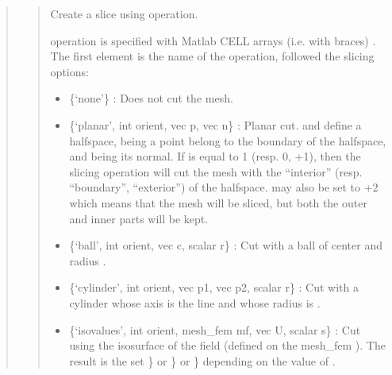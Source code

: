 \documentclass[a4paper,11pt,english]{sphinxmanual}
\begin{document}
\sphinxAtStartPar
{}
\begin{quote}

\sphinxAtStartPar
{}
\begin{quote}

\sphinxAtStartPar
Create a slice using  operation.

\sphinxAtStartPar
{} operation is specified with Matlab CELL arrays (i.e.
with braces) . The first element is the
name of the operation, followed the slicing options:
\begin{itemize}
\item {} 
\sphinxAtStartPar
\{‘none’\} :
Does not cut the mesh.

\item {} 
\sphinxAtStartPar
\{‘planar’, int orient, vec p, vec n\} :
Planar cut.  and  define a half\sphinxhyphen{}space,  being a point belong to
the boundary of the half\sphinxhyphen{}space, and  being its normal. If  is
equal to \sphinxhyphen{}1 (resp. 0, +1), then the slicing operation will cut the mesh
with the “interior” (resp. “boundary”, “exterior”) of the half\sphinxhyphen{}space.
 may also be set to +2 which means that the mesh will be sliced,
but both the outer and inner parts will be kept.

\item {} 
\sphinxAtStartPar
\{‘ball’, int orient, vec c, scalar r\} :
Cut with a ball of center  and radius .

\item {} 
\sphinxAtStartPar
\{‘cylinder’, int orient, vec p1, vec p2, scalar r\} :
Cut with a cylinder whose axis is the line  and whose radius
is .

\item {} 
\sphinxAtStartPar
\{‘isovalues’, int orient, mesh\_fem mf, vec U, scalar s\} :
Cut using the isosurface of the field  (defined on the mesh\_fem ).
The result is the set \}\textasciigrave{} or \}\textasciigrave{} or \}\textasciigrave{} depending on the value of
.


\end{itemize}
\end{quote}
\end{quote}
\end{document}
